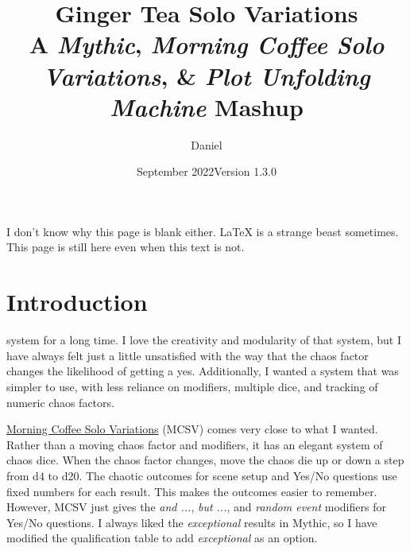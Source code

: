 

\title{
\Huge{Ginger Tea Solo Variations}
\\ \small{A \emph{Mythic}, \emph{Morning Coffee Solo Variations}, \& \emph{Plot Unfolding Machine} Mashup}
}
\date{September 2022\newline{}Version 1.3.0}
\author{Daniel}


\frontmatter
\maketitle

I don't know why this page is blank either. \LaTeX{} is a strange beast sometimes.
This page is still here even when this text is not.

\mainmatter

\section{Introduction}
system for a long time. I love the creativity and modularity of that system,
but I have always felt just a little unsatisfied with the way that the chaos
factor changes the likelihood of getting a yes. Additionally, I wanted a system
that was simpler to use, with less reliance on modifiers, multiple dice, and
tracking of numeric chaos factors.

\href{https://aleaiactandaest.blogspot.com/p/downloads.html}{Morning Coffee Solo
Variations} (MCSV) comes very close to what I wanted. Rather than a moving chaos
factor and modifiers, it has an elegant system of chaos dice. When the chaos
factor changes, move the chaos die up or down a step from d4 to d20. The chaotic
outcomes for scene setup and Yes/No questions use fixed numbers for each result.
This makes the outcomes easier to remember. However, MCSV just gives the
\emph{and ...}, \emph{but ...}, and \emph{random event} modifiers for Yes/No
questions. I always liked the \emph{exceptional} results in Mythic, so I have
modified the qualification table to add \emph{exceptional} as an option.

